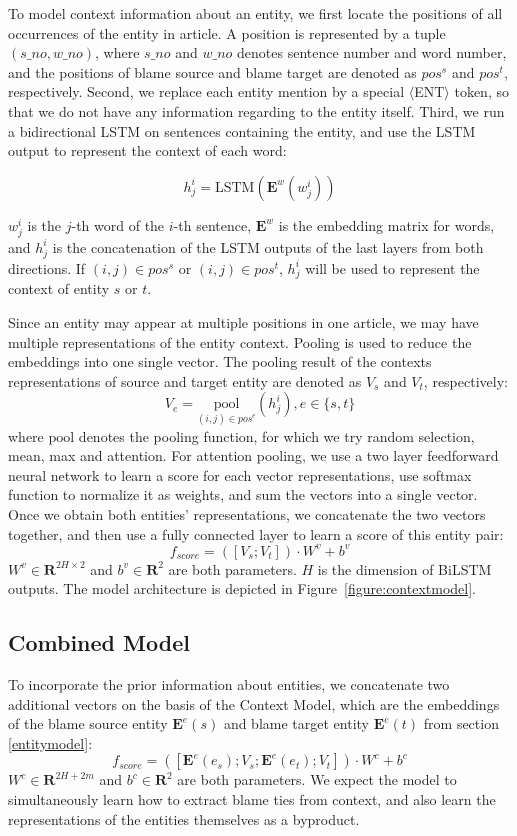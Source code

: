 \documentclass[letterpaper]{article} %
\begin{document}
To model context information about an entity, we first locate the positions of all occurrences of the entity in article. A position is represented by a tuple $(s\_no, w\_no)$, where $s\_no$ and $w\_no$ denotes sentence number and word number, and the positions of blame source and blame target are denoted as $pos^s$ and $pos^t$, respectively. Second, we replace each entity mention by a special $\langle$ENT$\rangle$ token, so that we do not have any information regarding to the entity itself. Third, we run a bidirectional LSTM on sentences containing the entity, and use the LSTM output to represent the context of each word:

$$h^i_j=\mathrm{LSTM}(\mathbf{E}^w(w^i_j))$$

$w^i_j$ is the $j$-th word of the $i$-th sentence, $\mathbf{E}^w$ is the embedding matrix for words, and $h^i_j$ is the concatenation of the LSTM outputs of the last layers from both directions. If $(i, j) \in pos^s$ or $(i, j) \in pos^t$, $h^i_j$ will be used to represent the context of entity $s$ or $t$.

Since an entity may appear at multiple positions in one article, we may have multiple representations of the entity context. Pooling is used to reduce the embeddings into one single vector. The pooling result of the contexts representations of source and target entity are denoted as $V_s$ and $V_t$, respectively: $$V_e = \underset{(i, j) \in pos^e} {\mathrm{pool}} (h^i_j), e \in \{s, t\}$$where $\mathrm{pool}$ denotes the pooling function, for which we try random selection, mean, max and attention. For attention pooling, we use a two layer feedforward neural network to learn a score for each vector representations, use softmax function to normalize it as weights, and sum the vectors into a single vector. Once we obtain both entities' representations, we concatenate the two vectors together, and then use a fully connected layer to learn a score of this entity pair: $$f_{score} = ([V_s; V_t]) \cdot W^v + b^v $$ $W^v \in \mathbf{R}^{2H \times 2}$ and $b^v \in \mathbf{R}^{2}$ are both parameters. $H$ is the dimension of BiLSTM outputs. The model architecture is depicted in Figure~\ref{figure:contextmodel}.

\subsection{Combined Model}

To incorporate the prior information about entities, we concatenate two additional vectors on the basis of the Context Model, which are the embeddings of the blame source entity $\mathbf{E}^e(s)$ and blame target entity $\mathbf{E}^e(t)$ from section \ref{entitymodel}: $$f_{score} = ([\mathbf{E}^e(e_s); V_s; \mathbf{E}^e(e_t); V_t]) \cdot W^c + b^c $$ $W^c \in \mathbf{R}^{2H + 2m}$ and $b^c \in \mathbf{R}^{2}$ are both parameters. We expect the model to simultaneously learn how to extract blame ties from context, and also learn the representations of the entities themselves as a byproduct.
\end{document}
